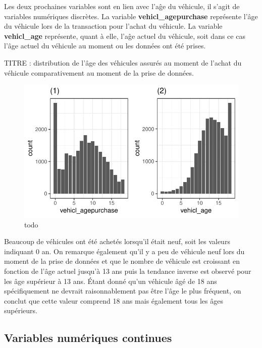 \documentclass[
]{article}
\begin{document}
Les deux prochaines variables sont en lien avec l'aĝe du véhicule, il
s'agit de variables numériques discrètes. La variable
\textbf{vehicl\_agepurchase} représente l'âge du véhicule lors de la
transaction pour l'achat du véhicule. La variable \textbf{vehicl\_age}
représente, quant à elle, l'aĝe actuel du véhicule, soit dans ce cas
l'âge actuel du véhicule au moment ou les données ont été prises.

TITRE : distribution de l'âge des véhicules assurés au moment de l'achat
du véhicule comparativement au moment de la prise de données.

\begin{figure}

{\centering \includegraphics{01-Rapport_files/figure-latex/graph_age-1} 

}

\caption{\label{fig:}todo}\label{fig:graph_age}
\end{figure}

Beaucoup de véhicules ont été achetés lorsqu'il était neuf, soit les
valeurs indiquant 0 an. On remarque également qu'il y a peu de véhicule
neuf lors du moment de la prise de données et que le nombre de véhicule
est croissant en fonction de l'âge actuel jusqu'à 13 ans puis la
tendance inverse est observé pour les âge supérieur à 13 ans. Étant
donné qu'un véhicule âgé de 18 ans spécifiquement ne devrait
raisonnablement pas être l'âge le plus fréquent, on conclut que cette
valeur comprend 18 ans mais également tous les âges supérieurs.

\hypertarget{variables-numuxe9riques-continues}{%
\subsection{Variables numériques
continues}\label{variables-numuxe9riques-continues}}
\end{document}
